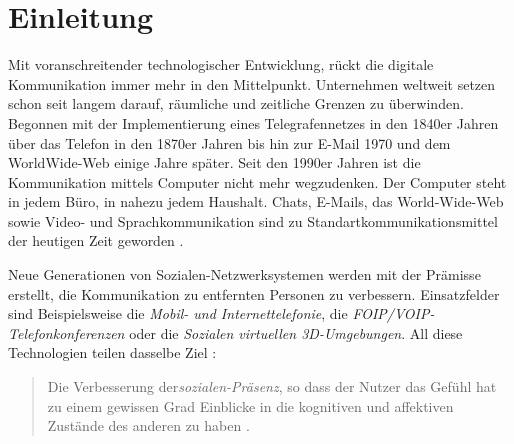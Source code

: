 \documentclass[a4paper,11pt]{article}%
\renewcommand{\\}{\vspace*{0.5\baselineskip} \newline}
\begin{document}


\section*{Einleitung}
	Mit voranschreitender technologischer Entwicklung, rückt die digitale Kommunikation immer mehr in den Mittelpunkt. Unternehmen weltweit setzen schon seit langem darauf, räumliche und zeitliche Grenzen zu überwinden. Begonnen mit der Implementierung eines Telegrafennetzes in den 1840er Jahren über das Telefon in den 1870er Jahren bis hin zur E-Mail 1970 und dem WorldWide-Web einige Jahre später. Seit den 1990er Jahren ist die Kommunikation mittels Computer nicht mehr wegzudenken. Der Computer steht in jedem Büro, in nahezu jedem Haushalt. Chats, E-Mails, das World-Wide-Web sowie Video- und Sprachkommunikation sind zu Standartkommunikationsmittel der heutigen Zeit geworden \citep[p. 14-16]{thurlow2004computer}.
	
Neue Generationen von Sozialen-Netzwerksystemen werden mit der Prämisse erstellt, die Kommunikation zu entfernten Personen zu verbessern.
Einsatzfelder sind Beispielsweise die \textit{Mobil- und Internettelefonie}, die \textit{FOIP/VOIP-Telefonkonferenzen} oder die \textit{Sozialen virtuellen 3D-Umgebungen}.
All diese Technologien teilen dasselbe Ziel : 
\begin{quote}
\glqq{}Die Verbesserung der\textit{sozialen-Präsenz}, so dass der Nutzer das Gefühl hat zu einem gewissen Grad Einblicke in die kognitiven und affektiven Zustände des anderen zu haben\dq{} \citep{biocca2002defining} \citep[S.407–447]{biocca2001plugging}.
\end{quote}
\end{document}
